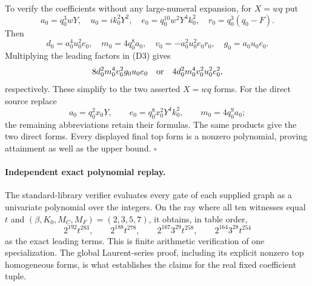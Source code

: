 To verify the coefficients without any large-numeral expansion, for
$X=wq$ put
\[
 a_0=q_0^3wY,\quad u_0=ik_0^2Y^2,\quad
 e_0=q_0^{10}w^2Y^4k_0^2,\quad r_0=q_0^3(q_0-F).
\]
Then
\[
 d_0=a_0^4u_0^2e_0,\quad m_0=4q_0^8a_0,\quad
 v_0=-a_0^2u_0^2e_0r_0,\quad g_0=a_0u_0e_0.
\]
Multiplying the leading factors in (D3) gives
\[
 8d_0^2m_0^4v_0^2g_0u_0e_0
 \quad\hbox{or}\quad
 4d_0^2m_0^4v_0^2u_0^2e_0^2,
\]
respectively.  These simplify to the two asserted $X=wq$ forms.
For the direct source replace
\[
 a_0=q_0^2x_0Y,\qquad
 e_0=q_0^8x_0^2Y^4k_0^2,\qquad m_0=4q_0^9a_0;
\]
the remaining abbreviations retain their formulas.  The same products
give the two direct forms.  Every displayed final top form is a nonzero
polynomial, proving attainment as well as the upper bound.
\hfill$\square$

\paragraph{Independent exact polynomial replay.}
The standard-library verifier evaluates every gate of each supplied
graph as a univariate polynomial over the integers.  On the ray where
all ten witnesses equal $t$ and
$(\beta,K_0,M_C,M_F)=(2,3,5,7)$, it obtains, in table order,
\[
 2^{192}t^{283},\qquad 2^{188}t^{278},\qquad
 2^{167}3^{29}t^{258},\qquad 2^{164}3^{28}t^{254}
\]
as the exact leading terms.  This is finite arithmetic verification of
one specialization.  The global Laurent-series proof, including its
explicit nonzero top homogeneous forms, is what establishes the claims
for the real fixed coefficient tuple.
